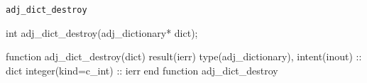 \begin{boxwithtitle}{\texttt{adj_dict_destroy}}
\begin{minipage}{\columnwidth}
\begin{ccode}
  int adj_dict_destroy(adj_dictionary* dict);
\end{ccode}
\begin{fortrancode}
  function adj_dict_destroy(dict) result(ierr)
    type(adj_dictionary), intent(inout) :: dict
    integer(kind=c_int) :: ierr
  end function adj_dict_destroy
\end{fortrancode}
\end{minipage}
\end{boxwithtitle}

